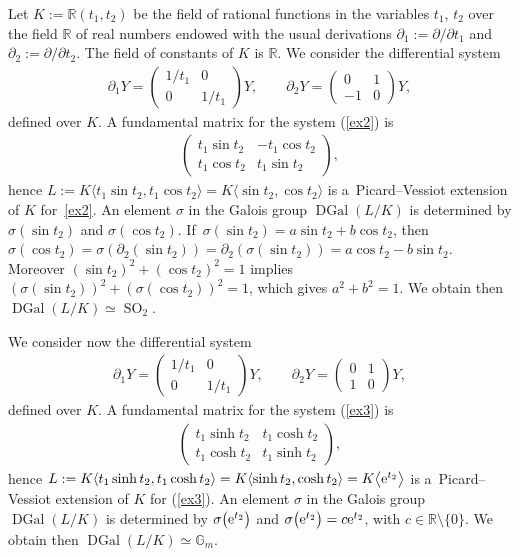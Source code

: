 \documentclass[10pt,a4paper]{amsart}
\numberwithin{equation}{section}
\newcommand{\G}{\mathbb{G}}
\newcommand{\R}{\mathbb{R}}
\def \DGal{\operatorname{DGal}}
\def \SO{\operatorname{SO}}
\begin{document}
\begin{Example} Let $K:=\R(t_1,t_2)$ be the field of rational functions in the variables $t_1$, $t_2$ over the field $\R$ of real numbers endowed with the usual derivations $\partial_1:= \partial /\partial t_1$ and $\partial_2:= \partial /\partial t_2$. The field of constants of $K$ is $\R$. We consider the differential system
\begin{gather}\label{ex2}
\partial_1 Y= \begin{pmatrix} 1/t_1 & 0 \\ 0 & 1/t_1 \end{pmatrix} Y,\qquad
\partial_2 Y= \begin{pmatrix} 0&1 \\ -1 &0 \end{pmatrix} Y,
\end{gather}
defined over $K$. A fundamental matrix for the system (\ref{ex2}) is
\begin{gather*}
\begin{pmatrix} t_1 \sin t_2 & -t_1 \cos t_2 \\ t_1 \cos t_2 & t_1 \sin t_2 \end{pmatrix}\!,
\end{gather*}
hence $L:=K\langle t_1 \sin t_2,t_1 \cos t_2 \rangle=K\langle \sin t_2, \cos t_2 \rangle$ is a~Picard--Vessiot extension of $K$ for~\eqref{ex2}.
An element $\sigma$ in the Galois group $\DGal(L/K)$ is determined by $\sigma(\sin t_2)$ and $\sigma(\cos t_2)$. If~$\sigma(\sin t_2)\allowbreak=a\sin t_2 +b \cos t_2$, then $\sigma(\cos t_2)=\sigma(\partial_2(\sin t_2))=\partial_2(\sigma(\sin t_2))=a\cos t_2 - b \sin t_2$. Moreover $(\sin t_2)^2+ (\cos t_2)^2=1$ implies $(\sigma(\sin t_2))^2+ (\sigma(\cos t_2))^2=1$, which gives $a^2+b^2=1$. We obtain then $\DGal(L/K) \simeq \SO_2$.

We consider now the differential system
\begin{gather}\label{ex3}
\partial_1 Y= \begin{pmatrix} 1/t_1 & 0 \\ 0 & 1/t_1 \end{pmatrix} Y,\qquad
\partial_2 Y= \begin{pmatrix} 0&1 \\ 1 &0 \end{pmatrix} Y,
\end{gather}
defined over $K$. A fundamental matrix for the system (\ref{ex3}) is
\begin{gather*}
\begin{pmatrix} t_1 \sinh t_2 & t_1 \cosh t_2 \\ t_1 \cosh t_2 & t_1 \sinh t_2 \end{pmatrix}\!,
\end{gather*}
hence $L:=K\langle t_1 \sinh t_2,t_1 \cosh t_2 \rangle=K\langle \sinh t_2, \cosh t_2 \rangle=K\big\langle {\rm e}^{t_2} \big\rangle$ is a~Picard--Vessiot extension of $K$ for (\ref{ex3}).
An element $\sigma$ in the Galois group $\DGal(L/K)$ is determined by $\sigma\big({\rm e}^{t_2}\big)$ and $\sigma\big({\rm e}^{t_2}\big)=c {\rm e}^{t_2}$, with $c \in \R\setminus \{0\}$. We obtain then $\DGal(L/K) \simeq \G_m$.


\end{Example}
\end{document}
